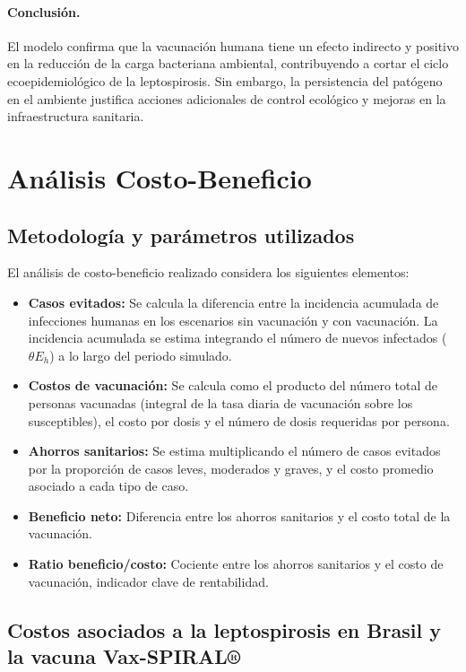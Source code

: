 \documentclass[12pt,a4paper]{article}
\begin{document}
\paragraph{Conclusión.} El modelo confirma que la vacunación humana tiene un efecto indirecto y positivo en la reducción de la carga bacteriana ambiental, contribuyendo a cortar el ciclo ecoepidemiológico de la leptospirosis. Sin embargo, la persistencia del patógeno en el ambiente justifica acciones adicionales de control ecológico y mejoras en la infraestructura sanitaria.


\newpage
\section{Análisis Costo-Beneficio}

\subsection{Metodología y parámetros utilizados}

El análisis de costo-beneficio realizado considera los siguientes elementos:

\begin{itemize}
    \item \textbf{Casos evitados:} Se calcula la diferencia entre la incidencia acumulada de infecciones humanas en los escenarios sin vacunación y con vacunación. La incidencia acumulada se estima integrando  el número de nuevos infectados ($\theta E_h$) a lo largo del periodo simulado.
    \item \textbf{Costos de vacunación:} Se calcula como el producto del número total de personas vacunadas (integral de la tasa diaria de vacunación sobre los susceptibles), el costo por dosis y el número de dosis requeridas por persona.
    \item \textbf{Ahorros sanitarios:} Se estima multiplicando el número de casos evitados por la proporción de casos leves, moderados y graves, y el costo promedio asociado a cada tipo de caso.
    \item \textbf{Beneficio neto:} Diferencia entre los ahorros sanitarios y el costo total de la vacunación.
    \item \textbf{Ratio beneficio/costo:} Cociente entre los ahorros sanitarios y el costo de vacunación, indicador clave de rentabilidad.
\end{itemize}


\subsection{Costos asociados a la leptospirosis en Brasil y la vacuna Vax-SPIRAL®}
\end{document}
